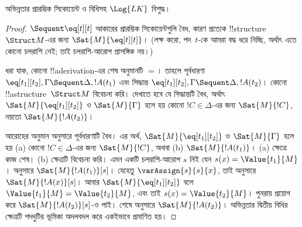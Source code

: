 \documentclass[../../../include/open-logic-section]{subfiles}
\begin{document}


\begin{prop}
অভিন্নতার প্রারম্ভিক সিকোয়েন্ট ও বিধিসহ $\Log{LK}$ বিশুদ্ধ।
\end{prop}

\begin{proof}
${} \Sequent \eq[t][t]$ আকারের প্রারম্ভিক সিকোয়েন্টগুলি বৈধ, কারণ
প্রত্যেক !!{structure}~$\Struct M$-এর জন্য $\Sat{M}{\eq[t][t]}$। (লক্ষ
করো, পদ~$t$-কে আমরা বদ্ধ ধরে নিচ্ছি, অর্থাৎ এতে কোনো চলরাশি নেই; তাই
চলরাশি-আরোপ প্রাসঙ্গিক নয়।)

ধরা যাক, কোনো !!a{derivation}-এর শেষ অনুমানটি $=$। তাহলে পূর্বধারণা
$\eq[t_1][t_2], \Gamma \Sequent \Delta, !A(t_1)$ এবং সিদ্ধান্ত
$\eq[t_1][t_2], \Gamma \Sequent \Delta, !A(t_2)$। কোনো
!!a{structure}~$\Struct M$ বিবেচনা করি। দেখাতে হবে যে সিদ্ধান্তটি
বৈধ, অর্থাৎ $\Sat{M}{\eq[t_1][t_2]}$ ও $\Sat{M}{\Gamma}$ হলে হয়
কোনো $!C \in \Delta$-এর জন্য $\Sat{M}{!C}$, নয়তো $\Sat{M}{!A(t_2)}$।

আরোহের অনুমান অনুসারে পূর্বধারণাটি বৈধ। এর অর্থ,
$\Sat{M}{\eq[t_1][t_2]}$ ও $\Sat{M}{\Gamma}$ হলে হয় (a) কোনো $!C
\in \Delta$-এর জন্য $\Sat{M}{!C}$, অথবা (b) $\Sat{M}{!A(t_1)}$।
(a) ক্ষেত্রে কাজ শেষ। (b) ক্ষেত্রটি বিবেচনা করি। এমন একটি চলরাশি-আরোপ
$s$ নিই যেন $s(x) = \Value{t_1}{M}$।
 অনুসারে
$\Sat{M}{!A(t_1)}[s]$। যেহেতু $\varAssign{s}{s}{x}$, তাই
 অনুসারে $\Sat{M}{!A(x)}[s]$। আবার
$\Sat{M}{\eq[t_1][t_2]}$ বলে $\Value{t_1}{M} = \Value{t_2}{M}$, এবং
তাই $s(x) = \Value{t_2}{M}$। পুনরায়
 প্রয়োগ করে
$\Sat{M}{!A(t_2)}[s]$-ও পাই। শেষে
 অনুসারে $\Sat{M}{!A(t_2)}$।
অভিন্নতার দ্বিতীয় বিধির ক্ষেত্রটি পদদুটির ভূমিকা অদলবদল করে একইভাবে
প্রমাণিত হয়।

\end{proof}
\end{document}
